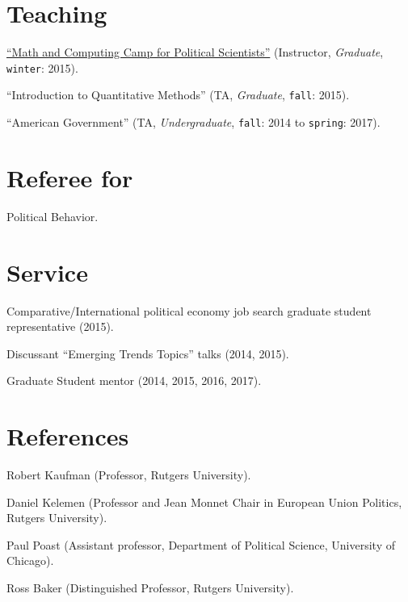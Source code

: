 \documentclass[letterpaper]{article}
\renewenvironment{itemize}{
  \begin{list}{}{
    \setlength{\leftmargin}{1.5em}
  }
}{
  \end{list}
}
\begin{document}
\section*{Teaching}

\begin{itemize}
\item[$\bullet$] \href{http://github.com/hbahamonde/Math-Camp/raw/master/Syllabus/Math_Camp_Syllabus.pdf/}{``Math and Computing Camp for Political Scientists''} (Instructor, \emph{Graduate}, \texttt{winter}: 2015).
\item[$\bullet$] ``Introduction to Quantitative Methods'' (TA, \emph{Graduate}, \texttt{fall}: 2015).
\item[$\bullet$] ``American Government'' (TA, \emph{Undergraduate}, \texttt{fall}: 2014 to \texttt{spring}: 2017).
\end{itemize}


\section*{Referee for}
  \begin{itemize}
    \item[$\bullet$] Political Behavior.
  \end{itemize}

\section*{Service}

\begin{itemize}
\item[$\bullet$] Comparative/International political economy job search graduate student representative (2015).
\item[$\bullet$] Discussant ``Emerging Trends Topics'' talks (2014, 2015).
\item[$\bullet$] Graduate Student mentor (2014, 2015, 2016, 2017).
\end{itemize}


\section*{References}
\begin{itemize}
\item[$\bullet$] Robert Kaufman {\scriptsize(Professor, Rutgers University).}
\item[$\bullet$] Daniel Kelemen {\scriptsize(Professor and Jean Monnet Chair in
European Union Politics, Rutgers University).}
\item[$\bullet$] Paul Poast {\scriptsize(Assistant professor, Department of Political Science, University of Chicago).}
\item[$\bullet$] Ross Baker {\scriptsize(Distinguished Professor, Rutgers University).}
\end{itemize}
\end{document}
